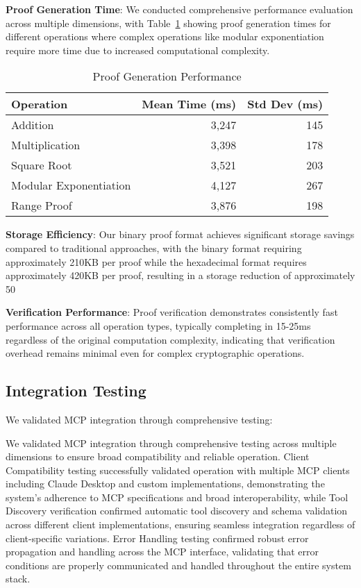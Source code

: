 \documentclass[11pt]{article}
\begin{document}
\textbf{Proof Generation Time}: We conducted comprehensive performance evaluation across multiple dimensions, with Table~\ref{tab:performance} showing proof generation times for different operations where complex operations like modular exponentiation require more time due to increased computational complexity.

\begin{table}[ht]
\centering
\caption{Proof Generation Performance}
\label{tab:performance}
\begin{tabular}{lrr}
\toprule
Operation & Mean Time (ms) & Std Dev (ms) \\
\midrule
Addition & 3,247 & 145 \\
Multiplication & 3,398 & 178 \\
Square Root & 3,521 & 203 \\
Modular Exponentiation & 4,127 & 267 \\
Range Proof & 3,876 & 198 \\
\bottomrule
\end{tabular}
\end{table}

\textbf{Storage Efficiency}: Our binary proof format achieves significant storage savings compared to traditional approaches, with the binary format requiring approximately 210KB per proof while the hexadecimal format requires approximately 420KB per proof, resulting in a storage reduction of approximately 50%

\textbf{Verification Performance}: Proof verification demonstrates consistently fast performance across all operation types, typically completing in 15-25ms regardless of the original computation complexity, indicating that verification overhead remains minimal even for complex cryptographic operations.

\subsection{Integration Testing}

We validated MCP integration through comprehensive testing:

We validated MCP integration through comprehensive testing across multiple dimensions to ensure broad compatibility and reliable operation. Client Compatibility testing successfully validated operation with multiple MCP clients including Claude Desktop and custom implementations, demonstrating the system's adherence to MCP specifications and broad interoperability, while Tool Discovery verification confirmed automatic tool discovery and schema validation across different client implementations, ensuring seamless integration regardless of client-specific variations. Error Handling testing confirmed robust error propagation and handling across the MCP interface, validating that error conditions are properly communicated and handled throughout the entire system stack.
\end{document}
